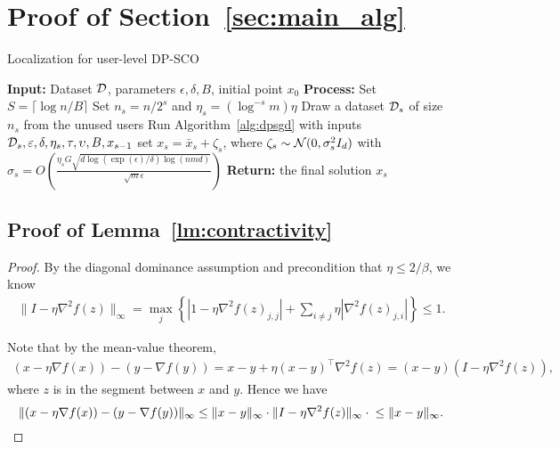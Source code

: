 \newpage
\section{Proof of Section~\ref{sec:main_alg}}
\begin{algorithm2e}
    \caption{Localization for user-level DP-SCO}
    \label{alg:loacalizatioin}
    \textbf{Input:} Dataset $\mathcal{D}$, parameters $\epsilon,\delta,B$, initial point $x_0$\;
    \textbf{Process:}
    Set $S=\lceil \log n/B\rceil $\;
    {
    Set $n_s=n/2^s$ and $\eta_s=(\log^{-s}m)\eta$\;
    Draw a dataset $\mathcal{D}_s$ of size $n_s$ from the unused users\;
    Run Algorithm~\ref{alg:dpsgd} with inputs $\mathcal{D}_s,\varepsilon,\delta,\eta_s,\tau,\upsilon,B,x_{s-1}$\;
    set $x_s=\bar{x}_s+\zeta_s$, where $\zeta_s\sim \mathcal{N}(0,\sigma_s^2I_d)$ with $\sigma_s=O(\frac{\eta_s G\sqrt{d\log(\exp(\epsilon)/\delta)\log(nmd)}}{\sqrt{m}\epsilon})$\;
    }
     \textbf{ Return:} the final solution $x_s$
\end{algorithm2e}

\subsection{Proof of Lemma~\ref{lm:contractivity}}
\contractivity*
\begin{proof}
By the diagonal dominance assumption and precondition that $\eta\le 2/\beta$, we know
\begin{align*}
    \|I-\eta\nabla^2f(z)\|_\infty=\max_{j}\left\{|1-\eta\nabla^2 f(z)_{j,j}|+\sum_{i\neq j}\eta |\nabla^2 f(z)_{j,i}|\right\}\le 1.
\end{align*}

Note that by the mean-value theorem, 
\begin{align*}
    (x-\eta \nabla f(x)) - (y-\nabla f(y))= x-y+\eta (x-y)^\top \nabla^2 f(z) = (x-y)(I-\eta \nabla^2 f(z)),
\end{align*}
where $z$ is in the segment between $x$ and $y$.
Hence we have
\[
\| (x-\eta \nabla f(x)) - (y-\nabla f(y)) \|_\infty  
\le \|x-y\|_\infty \cdot \|I-\eta \nabla^2 f(z) \|_\infty\cdot \\
\le \|x-y\|_\infty.
\]
\end{proof}

